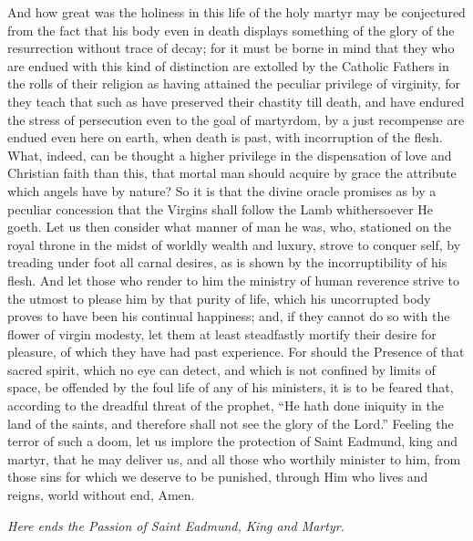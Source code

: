 \documentclass[10pt]{book}
\begin{document}
\begin{paracol}{2}
And how great was the holiness in this life of the holy martyr may be conjectured from the fact that his body even in death displays something of the glory of the resurrection without trace of decay; for it must be borne in mind that they who are endued with this kind of distinction are extolled by the Catholic Fathers in the rolls of their religion as having attained the peculiar privilege of virginity, for they teach that such as have preserved their chastity till death, and have endured the stress of persecution even to the goal of martyrdom, by a just recompense are endued even here on earth, when death is past, with incorruption of the flesh. What, indeed, can be thought a higher privilege in the dispensation of love and Christian faith than this, that mortal man should acquire by grace the attribute which angels have by nature? So it is that the divine oracle promises as by a peculiar concession that the Virgins shall follow the Lamb whithersoever He goeth. Let us then consider what manner of man he was, who, stationed on the royal throne in the midst of worldly wealth and luxury, strove to conquer self, by treading under foot all carnal desires, as is shown by the incorruptibility of his flesh. And let those who render to him the ministry of human reverence strive to the utmost to please him by that purity of life, which his uncorrupted body proves to have been his continual happiness; and, if they cannot do so with the flower of virgin modesty, let them at least steadfastly mortify their desire for pleasure, of which they have had past experience. For should the Presence of that sacred spirit, which no eye can detect, and which is not confined by limits of space, be offended by the foul life of any of his ministers, it is to be feared that, according to the dreadful threat of the prophet, ``He hath done iniquity in the land of the saints, and therefore shall not see the glory of the Lord.'' Feeling the terror of such a doom, let us implore the protection of Saint Eadmund, king and martyr, that he may deliver us, and all those who worthily minister to him, from those sins for which we deserve to be punished, through Him who lives and reigns, world without end, Amen.

\vspace{-.3cm}
\begin{center}
\parbox{4cm}{\footnotesize\emph{Here ends the Passion of Saint Eadmund, King and Martyr.}}
\end{center}

\end{paracol}
\end{document}
